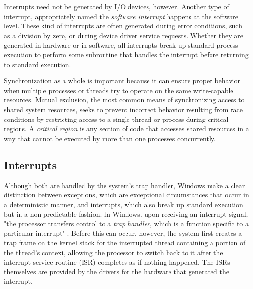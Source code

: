\documentclass[onecolumn, draftclsnofoot,10pt, compsoc]{IEEEtran}
\begin{document}
Interrupts need not be generated by I/O devices, however. Another type of interrupt, appropriately named the \textit{software interrupt} happens at the software level. These kind of interrupts are often generated during error conditions, such as a division by zero, or during device driver service requests. Whether they are generated in hardware or in software, all interrupts break up standard process execution to perform some subroutine that handles the interrupt before returning to standard execution. 

Synchronization as a whole is important because it can ensure proper behavior when multiple processes or threads try to operate on the same write-capable resources. Mutual exclusion, the most common means of synchronizing access to shared system resources, seeks to prevent incorrect behavior resulting from race conditions by restricting access to a single thread or process during critical regions. A \textit{critical region} is any section of code that accesses shared resources in a way that cannot be executed by more than one processes concurrently.
\subsection{Interrupts}
Although both are handled by the system's trap handler, Windows make a clear distinction between exceptions, which are exceptional circumstances that occur in a deterministic manner, and interrupts, which also break up standard execution but in a non-predictable fashion. In Windows, upon receiving an interrupt signal, "the processor transfers control to a \textit{trap handler}, which is a function specific to a particular interrupt" \cite{WindowsInternals}. Before this can occur, however, the system first creates a trap frame on the kernel stack for the interrupted thread containing a portion of the thread's context, allowing the processor to switch back to it after the interrupt service routine (ISR) completes as if nothing happened. The ISRs themselves are provided by the drivers for the hardware that generated the interrupt. 
\end{document}
